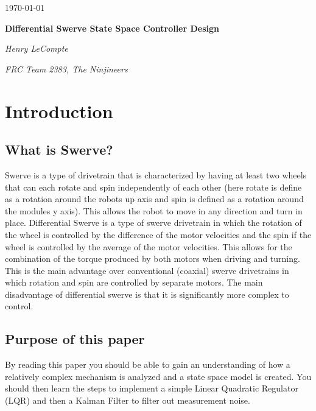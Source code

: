 \documentclass{scrartcl}
\begin{document}
\begin{titlepage}
    \centering
    {\large \today\par}
    \vfill

    {\huge\bfseries Differential Swerve State Space Controller Design\par}
    \vfill

    {\Large\itshape Henry LeCompte}\par
    {\itshape FRC Team 2383, The Ninjineers}\par
    \vspace{1.5cm}

    \vfill
\end{titlepage}

\newpage

\doublespacing
\tableofcontents
\singlespacing

\newpage

\doublespacing

\section{Introduction}
\subsection*{What is Swerve?}
Swerve is a type of drivetrain that is characterized by having at least two wheels that can each rotate and spin independently of each other (here rotate is define as a rotation around the robots up axis and spin is defined as a rotation around the modules y axis). This allows the robot to move in any direction and turn in place. Differential Swerve is a type of swerve drivetrain in which the rotation of the wheel is controlled by the difference of the motor velocities and the spin if the wheel is controlled by the average of the motor velocities. This allows for the combination of the torque produced by both motors when driving and turning. This is the main advantage over conventional (coaxial) swerve drivetrains in which rotation and spin are controlled by separate motors. The main disadvantage of differential swerve is that it is significantly more complex to control.

\subsection{Purpose of this paper}
By reading this paper you should be able to gain an understanding of how a relatively complex mechanism is analyzed and a state space model is created. You should then learn the steps to implement a simple Linear Quadratic Regulator (LQR) and then a Kalman Filter to filter out measurement noise.
\end{document}
